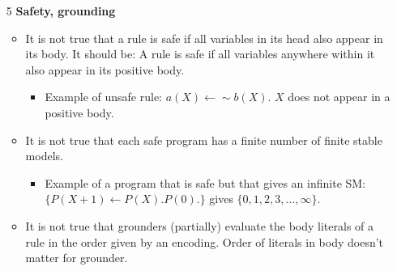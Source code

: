 \documentclass[9pt,a4paper,landscape]{article}
\begin{document}
{\begin{itemize}
	\item[5] \textbf{Safety, grounding}
	\begin{itemize}[noitemsep]
		\item It is not true that a rule is safe if all variables in its head also appear in its body. It should be: A rule is safe if all variables anywhere within it also appear in its positive body.
		\begin{itemize}[noitemsep]
			\item Example of unsafe rule: $a(X) \leftarrow {\sim} b(X)$. $X$ does not appear in a positive body.
		\end{itemize}
		\item It is not true that each safe program has a finite number of finite stable models.
		\begin{itemize}[noitemsep]
			\item Example of a program that is safe but that gives an infinite SM: $\{ P(X+1) \leftarrow P(X). P(0). \}$ gives $\{0, 1, 2, 3, \ldots, \infty \}$.
		\end{itemize}
		\item It is not true that grounders (partially) evaluate the body literals of a rule in the order given by an encoding. Order of literals in body doesn't matter for grounder.
	\end{itemize}
	
	\pagebreak
	

\end{itemize}}
\end{document}
